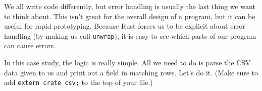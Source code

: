\documentclass[a4paper,]{book}
\begin{document}

We all write code differently, but error handling is usually the last
thing we want to think about. This isn't great for the overall design of
a program, but it can be useful for rapid prototyping. Because Rust
forces us to be explicit about error handling (by making us call
\texttt{unwrap}), it is easy to see which parts of our program can cause
errors.

In this case study, the logic is really simple. All we need to do is
parse the CSV data given to us and print out a field in matching rows.
Let's do it. (Make sure to add \texttt{extern\ crate\ csv;} to the top
of your file.)
\end{document}

